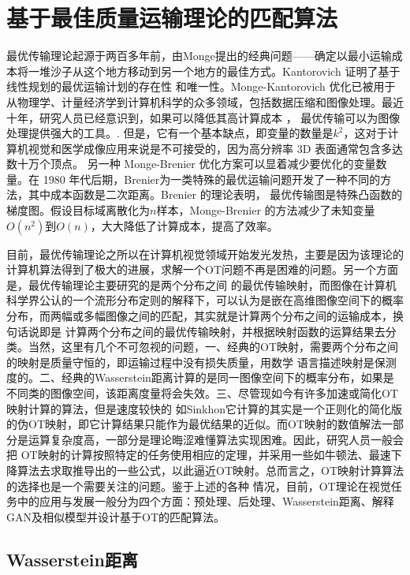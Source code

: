 \section{基于最佳质量运输理论的匹配算法}

最优传输理论起源于两百多年前，由Monge提出的经典问题——确定以最小运输成本将一堆沙子从这个地方移动到另一个地方的最佳方式\cite{bonnotte2013knothe}。Kantorovich \cite{kantorovich2006problem}证明了基于线性规划的最优运输计划的存在性
和唯一性。Monge-Kantorovich 优化已被用于从物理学、计量经济学到计算机科学的众多领域，包括数据压缩和图像处理\cite{rachev1998mass}。最近十年，研究人员已经意识到，如果可以降低其高计算成本\cite{dominitz2009texture,ur20093d} ，
最优传输可以为图像处理提供强大的工具。. 但是，它有一个基本缺点，即变量的数量是$k^2$，这对于计算机视觉和医学成像应用来说是不可接受的，因为高分辨率 3D 表面通常包含多达数十万个顶点。
另一种 Monge-Brenier 优化方案可以显着减少要优化的变量数量。在 1980 年代后期，Brenier\cite{brenier1991polar}为一类特殊的最优运输问题开发了一种不同的方法，其中成本函数是二次距离。Brenier 的理论表明，
最优传输图是特殊凸函数的梯度图。假设目标域离散化为$n$样本，Monge-Brenier 的方法减少了未知变量$O(n^2)$到$O(n)$，大大降低了计算成本，提高了效率。

目前，最优传输理论之所以在计算机视觉领域开始发光发热，主要是因为该理论的计算机算法得到了极大的进展，求解一个OT问题不再是困难的问题。另一个方面是，最优传输理论主要研究的是两个分布之间
的最优传输映射，而图像在计算机科学界公认的一个流形分布定则的解释下，可以认为是嵌在高维图像空间下的概率分布，而两幅或多幅图像之间的匹配，其实就是计算两个分布之间的运输成本，换句话说即是
计算两个分布之间的最优传输映射，并根据映射函数的运算结果去分类。当然，这里有几个不可忽视的问题，一、经典的OT映射，需要两个分布之间的映射是质量守恒的，即运输过程中没有损失质量，用数学
语言描述映射是保测度的。二、经典的Wasserstein距离计算的是同一图像空间下的概率分布，如果是不同类的图像空间，该距离度量将会失效。三、尽管现如今有许多加速或简化OT映射计算的算法，但是速度较快的
如Sinkhon它计算的其实是一个正则化的简化版的伪OT映射，即它计算结果只能作为最优结果的近似。而OT映射的数值解法一部分是运算复杂度高，一部分是理论晦涩难懂算法实现困难。因此，研究人员一般会把
OT映射的计算按照特定的任务使用相应的定理，并采用一些如牛顿法、最速下降算法去求取推导出的一些公式，以此逼近OT映射。总而言之，OT映射计算算法的选择也是一个需要关注的问题。鉴于上述的各种
情况，目前，OT理论在视觉任务中的应用与发展一般分为四个方面：预处理、后处理、Wasserstein距离、解释GAN及相似模型并设计基于OT的匹配算法。

\subsection{Wasserstein距离}

